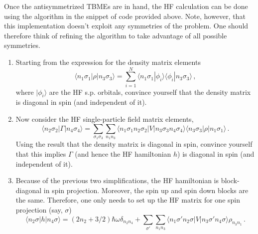 \documentclass[letterpaper,12pt]{article}
\begin{document}
Once the antisymmetrized TBMEs are in hand, the HF calculation can be done using the algorithm in the snippet of code provided above. Note, however, that this implementation doesn't exploit any symmetries of the problem. One should therefore think of refining the algorithm to take advantage 
of all possible symmetries.
\begin{enumerate}
\item Starting from the expression for the density matrix elements
\begin{equation}
\langle n_1\sigma_1|\rho|n_3\sigma_3\rangle = \sum_{i=1}^{N}\langle n_1\sigma_1|\phi_{i}\rangle\langle \phi_i|n_3\sigma_3\rangle\,,
\end{equation}
where $|\phi_i\rangle$ are the HF s.p. orbitals, convince yourself that the density matrix is diagonal in spin (and independent of it). 
\item Now consider the HF single-particle field matrix elements,
\begin{equation}
\langle n_2\sigma_2|\Gamma|n_4\sigma_4\rangle = \sum_{\sigma_1\sigma_3}\sum_{n_1n_3}\langle n_1\sigma_1n_2\sigma_2|V|n_3\sigma_3n_4\sigma_4\rangle \langle n_3\sigma_3|\rho|n_1\sigma_1\rangle\,.
\end{equation}
Using the result that the density matrix is diagonal in spin, convince yourself that this implies $\Gamma$ (and hence the HF hamiltonian $h$) is diagonal in spin (and independent of it).  
\item Because of the previous two simplifications, the HF hamiltonian is block-diagonal in spin projection. Moreover, the spin up and spin down blocks are the same. Therefore, one only needs to set up the HF matrix for one spin projection (say, $\sigma$)
\begin{equation}
\langle n_2\sigma|h|n_4\sigma\rangle = (2n_2+3/2)\hbar\omega \delta_{n_2n_4} + \sum_{\sigma'}\sum_{n_1n_3}\langle n_1\sigma'n_2\sigma|V|n_3\sigma'n_4\sigma\rangle\rho_{n_3n_1}\,.
\end{equation}
\end{enumerate}


\newpage
\end{document}
